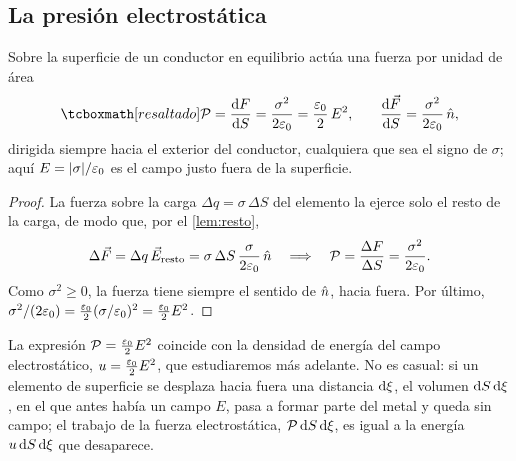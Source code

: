 \subsection{La presión electrostática}\label{sec:presion-valor}
\begin{teorema}\label{teo:presion}
Sobre la superficie de un conductor en equilibrio actúa una fuerza por unidad de área
\begin{equation}\label{eq:presion}
  \resalta{\Pel=\frac{\dif F}{\dif S}=\frac{\sigma^{2}}{2\eo}=\frac{\eo}{2}\,E^{2},}\qquad
  \frac{\dif\vF}{\dif S}=\frac{\sigma^{2}}{2\eo}\,\un ,
\end{equation}
dirigida siempre hacia el exterior del conductor, cualquiera que sea el signo de $\sigma$; aquí $E=\lvert \sigma\rvert/\varepsilon_{0}$ es el campo justo fuera de la superficie.
\end{teorema}
\begin{proof}
La fuerza sobre la carga $\Delta q=\sigma\,\Delta S$ del elemento la ejerce solo el resto de la carga, de modo que, por el \cref{lem:resto},
\[
  \Delta\vec{F}=\Delta q\,\vec{E}_{\mathrm{resto}}=\sigma\,\Delta S\,\frac{\sigma}{2\varepsilon_{0}}\,\hat{n}
  \quad\Longrightarrow\quad\mathcal{P}=\frac{\Delta F}{\Delta S}=\frac{\sigma^{2}}{2\varepsilon_{0}} .
\]
Como $\sigma^{2}\ge0$, la fuerza tiene siempre el sentido de $\hat{n}$, hacia fuera. Por último, $\sigma^{2}/(2\varepsilon_{0})=\tfrac{\varepsilon_{0}}{2}(\sigma/\varepsilon_{0})^{2}=\tfrac{\varepsilon_{0}}{2}E^{2}$.
\end{proof}

\begin{observacion}\label{obs:presion-energia}
La expresión $\mathcal{P}=\tfrac{\varepsilon_{0}}{2}E^{2}$ coincide con la densidad de energía del campo electrostático, $u=\tfrac{\varepsilon_{0}}{2}E^{2}$, que estudiaremos más
adelante. No es casual: si un elemento de superficie se desplaza hacia fuera una distancia $\mathrm{d}\xi$, el volumen $\mathrm{d} S\,\mathrm{d}\xi$, en el que antes había
un campo $E$, pasa a formar parte del metal y queda sin campo; el trabajo de la fuerza electrostática, $\mathcal{P}\,\mathrm{d} S\,\mathrm{d}\xi$, es igual a la energía
$u\,\mathrm{d} S\,\mathrm{d}\xi$ que desaparece.
\end{observacion}

